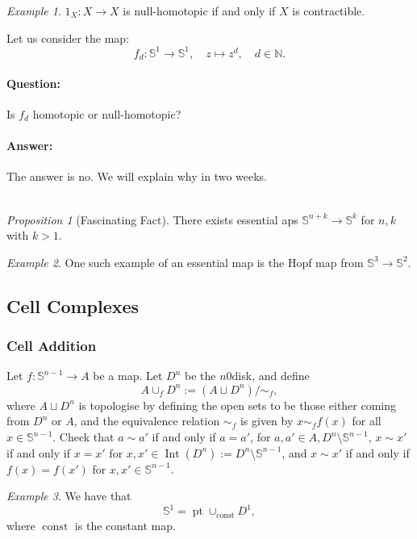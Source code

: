 \documentclass[a4paper]{report}
\theoremstyle{definition}
\theoremstyle{remark}
\theoremstyle{proposition}
\newtheorem{proposition}{Proposition}
\theoremstyle{conjecture}
\theoremstyle{lemma}
\theoremstyle{corollary}
\theoremstyle{exercise}
\newtheorem{example}{Example}
\newcommand{\on}{\operatorname}
\begin{document}
\begin{example}
    $1_X : X \to X$ is null-homotopic if and only if $X$ is contractible.
\end{example}

Let us consider the map:
$$f_d : \mathbb{S}^1 \longrightarrow \mathbb{S}^1,\quad z\longmapsto z^d, \quad d\in \mathbb{N}.$$

\paragraph{Question:} Is $f_d$ homotopic or null-homotopic? 
\paragraph{Answer:} The answer is no. We will explain why in two weeks.\\\\
\begin{proposition}[Fascinating Fact]
    There exists essential aps $\mathbb{S}^{n+k} \to \mathbb{S}^k$ for $n,k$ with $k > 1$.
\end{proposition}

\begin{example}
    One such example of an essential map is the Hopf map from $\mathbb{S}^3 \to \mathbb{S}^2$.
\end{example}

\subsection{Cell Complexes}

\subsubsection{Cell Addition}

Let $f : \mathbb{S}^{n-1} \to A$ be a map. Let $D^n$ be the $n$0disk, and define 
$$A \cup_f D^n := (A \sqcup D^n)/\sim_f,$$
where $A \sqcup D^n$ is topologise by defining the open sets to be those either coming from $D^n$ or $A$, and
the equivalence relation
$\sim_f$ is given by 
$x \sim_f f(x)$ for all $x\in \mathbb{S}^{n-1}$.
Check that $a \sim a'$ if and only if $a = a'$, for $a,a' \in A, D^n\setminus \mathbb{S}^{n-1}$,
$x\sim x'$ if and only if $x=x'$ for $x,x' \in \on{Int}(D^n) := D^n\setminus \mathbb{S}^{n-1}$,
and $x\sim x'$ if and only if 
$f(x) = f(x')$ for $x,x' \in \mathbb{S}^{n-1}$.

\begin{example}
    We have that $$\mathbb{S}^1 = \on{pt} \cup_{\on{const}} D^1,$$
    where $\on{const}$ is the constant map.
\end{example}
\end{document}
